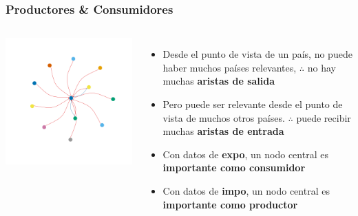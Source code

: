 \documentclass[professionalfont,fleqn]{beamer}
\begin{document}
\begin{frame}
\frametitle{Productores \& Consumidores}	
	\begin{columns}
			\includegraphics[width=\linewidth]{toy_graph1}
		
		\begin{itemize}
			\item Desde el punto de vista de un país, no puede haber muchos países relevantes, $\therefore$ no hay muchas \textbf{aristas de salida}
			\item Pero puede ser relevante desde el punto de vista de muchos otros países.
			$\therefore$ puede recibir muchas \textbf{aristas de entrada}
			\item Con datos de \textbf{expo}, un nodo central es \textbf{importante como consumidor}
			\item Con datos de \textbf{impo}, un nodo central es \textbf{importante como productor}
		\end{itemize}	
	\end{columns}	
\end{frame}
		
\end{document}
